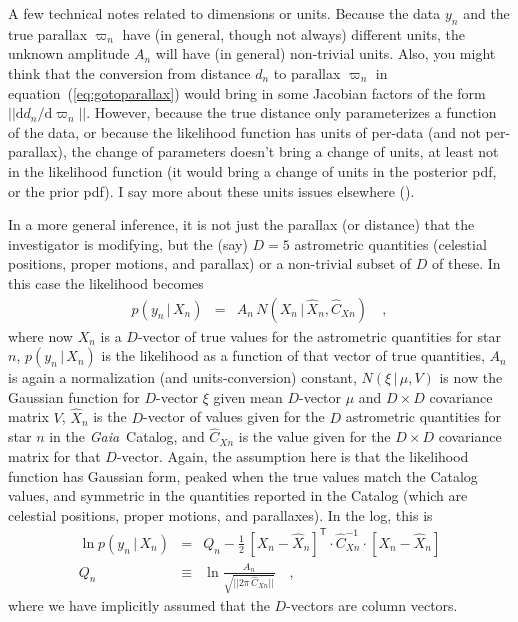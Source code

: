 \documentclass[12pt, modern]{aastex62}
\newcommand{\Gaia}{\textsl{Gaia}}
\newcommand{\equationname}{equation}
\newcommand{\dd}{\mathrm{d}}
\newcommand{\given}{\,|\,}
\newcommand{\T}{^{\mathsf{T}}}
\newcommand{\inv}{^{-1}}
\begin{document}
A few technical notes related to dimensions or units.
Because the data $y_n$ and
the true parallax $\varpi_n$ have (in general, though not always) different units,
the unknown amplitude $A_n$ will have (in general) non-trivial units.
Also, you might think
that the conversion from distance $d_n$ to parallax $\varpi_n$
in \equationname~(\ref{eq:gotoparallax})
would bring in some Jacobian factors of the form $||\dd d_n/\dd\varpi_n||$.
However, because the true distance only parameterizes a function of the data,
or because the likelihood function has units of per-data (and not per-parallax),
the change of parameters doesn't bring a change of units, at least not in the
likelihood function (it would bring a change of units in the posterior pdf, or the
prior pdf).
I say more about these units issues elsewhere (\citealt{calculus}).

In a more general inference, it is not just the parallax (or distance)
that the investigator is modifying, but the (say) $D=5$ astrometric quantities
(celestial positions, proper motions, and parallax)
or a non-trivial subset of $D$ of these.
In this case the likelihood becomes
\begin{eqnarray}
p(y_n\given X_n) &=& A_n\,N(X_n\given\hat{X}_n,\hat{C}_{Xn})
\label{eq:like}
\quad ,
\end{eqnarray}
where now
$X_n$ is a $D$-vector of true values for the astrometric quantities for star $n$,
$p(y_n\given X_n)$ is the likelihood as a function of that vector of true quantities,
$A_n$ is again a normalization (and units-conversion) constant,
$N(\xi\given\mu,V)$ is now the Gaussian function for $D$-vector $\xi$ given mean $D$-vector $\mu$ and $D\times D$ covariance matrix $V$,
$\hat{X}_n$ is the $D$-vector of values given for the $D$ astrometric quantities for star $n$ in the \Gaia\ Catalog,
and $\hat{C}_{Xn}$ is the value given for the $D\times D$ covariance matrix for that
$D$-vector.
Again, the assumption here is that the likelihood function has Gaussian form, peaked
when the true values match the Catalog values, and symmetric in the quantities
reported in the Catalog (which are celestial positions, proper motions, and parallaxes).
In the log, this is
\begin{eqnarray}
\ln p(y_n\given X_n) &=& Q_n - \frac{1}{2}\,[X_n - \hat{X}_n]\T\cdot\hat{C}_{Xn}\inv\cdot [X_n - \hat{X}_n]
\\
Q_n &\equiv& \ln\frac{A_n}{\sqrt{||2\pi\,\hat{C}_{Xn}||}}
\quad ,
\end{eqnarray}
where we have implicitly assumed that the $D$-vectors are column vectors.
\end{document}

